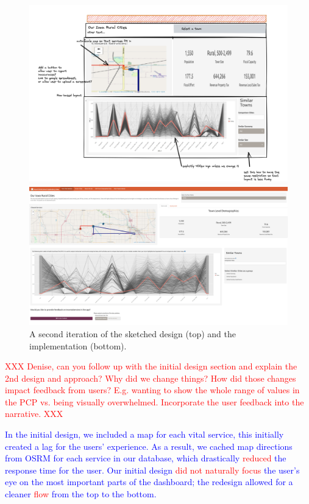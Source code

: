 \documentclass[letterpaper,inpress]{jdsart}
\begin{document}
\begin{figure}
\includegraphics[width=.8\textwidth]{Version3}

\includegraphics[width=\textwidth]{Version4}
\caption{A second iteration of the sketched design (top) and the implementation (bottom).}\label{fig:v2}
\end{figure}

{\textcolor{red}{XXX Denise, can you follow up with the initial design section and explain the 2nd design and approach? Why did we change things? How did those changes impact feedback from users? E.g. wanting to show the whole range of values in the PCP vs. being visually overwhelmed. Incorporate the user feedback into the narrative. XXX}}

{\textcolor{blue}{In the initial design, we included a map for each vital service, this initially created a lag for the users' experience. As a result, we cached map directions from OSRM for each service in our database, which drastically}} {\textcolor{red}{reduced}} {\textcolor{blue}{the response time for the user. Our initial design {\textcolor{red}{did not naturally focus}} the user's eye on the most important parts of the dashboard; the redesign allowed for a cleaner {\textcolor{red}{flow}} from the top to the bottom. }}
\end{document}

